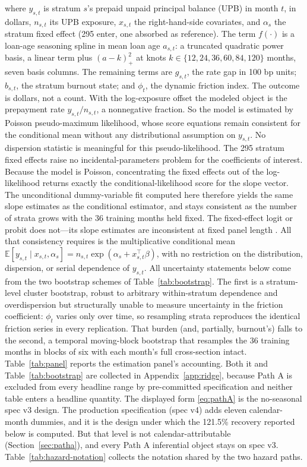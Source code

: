 \documentclass[12pt]{article}
\begin{document}
where $y_{s,t}$ is stratum $s$'s prepaid unpaid principal balance (UPB) in month $t$, in dollars, $n_{s,t}$ its UPB exposure, $x_{s,t}$ the right-hand-side covariates, and $\alpha_{s}$ the stratum fixed effect (295 enter, one absorbed as reference). The term $f(\cdot)$ is a loan-age seasoning spline in mean loan age $a_{s,t}$: a truncated quadratic power basis, a linear term plus $(a - k)_+^2$ at knots $k \in \{12, 24, 36, 60, 84, 120\}$ months, seven basis columns. The remaining terms are $g_{s,t}$, the rate gap in 100 bp units; $b_{s,t}$, the stratum burnout state; and $\phi_t$, the dynamic friction index. The outcome is dollars, not a count. With the log-exposure offset the modeled object is the prepayment rate $y_{s,t}/n_{s,t}$, a nonnegative fraction. So the model is estimated by Poisson pseudo-maximum likelihood, whose score equations remain consistent for the conditional mean without any distributional assumption on $y_{s,t}$. No dispersion statistic is meaningful for this pseudo-likelihood. The 295 stratum fixed effects raise no incidental-parameters problem for the coefficients of interest. Because the model is Poisson, concentrating the fixed effects out of the log-likelihood returns exactly the conditional-likelihood score for the slope vector. The unconditional dummy-variable fit computed here therefore yields the same slope estimates as the conditional estimator, and stays consistent as the number of strata grows with the 36 training months held fixed. The fixed-effect logit or probit does not---its slope estimates are inconsistent at fixed panel length \citep{wooldridge1999}. All that consistency requires is the multiplicative conditional mean $\mathbb{E}[y_{s,t}\mid x_{s,t},\alpha_{s}] = n_{s,t}\exp(\alpha_{s} + x_{s,t}^{\top}\beta)$, with no restriction on the distribution, dispersion, or serial dependence of $y_{s,t}$. All uncertainty statements below come from the two bootstrap schemes of Table~\ref{tab:bootstrap}. The first is a stratum-level cluster bootstrap, robust to arbitrary within-stratum dependence and overdispersion but structurally unable to measure uncertainty in the friction coefficient: $\phi_t$ varies only over time, so resampling strata reproduces the identical friction series in every replication. That burden (and, partially, burnout's) falls to the second, a temporal moving-block bootstrap that resamples the 36 training months in blocks of six with each month's full cross-section intact. Table~\ref{tab:panel} reports the estimation panel's accounting. Both it and Table~\ref{tab:bootstrap} are collected in Appendix~\ref{app:ridge}, because Path A is excluded from every headline range by pre-committed specification and neither table enters a headline quantity. The displayed form \eqref{eq:pathA} is the no-seasonal spec v3 design. The production specification (spec v4) adds eleven calendar-month dummies, and it is the design under which the 121.5\% recovery reported below is computed. But that level is not calendar-attributable (Section~\ref{sec:patha}), and every Path A inferential object stays on spec v3. Table~\ref{tab:hazard-notation} collects the notation shared by the two hazard paths.
\end{document}
